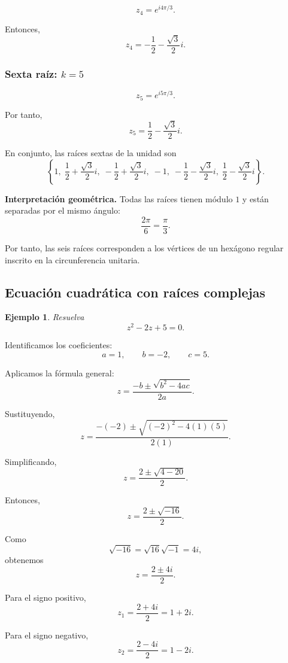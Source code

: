 \documentclass[12pt]{article}
\newtheorem{Ejem}{Ejemplo}
\begin{document}
\[
z_4=e^{i4\pi/3}.
\]

Entonces,
\[
\boxed{
z_4=
-\frac12-\frac{\sqrt3}{2}i
}.
\]

\subsubsection*{Sexta raíz: $k=5$}

\[
z_5=e^{i5\pi/3}.
\]

Por tanto,
\[
\boxed{
z_5=
\frac12-\frac{\sqrt3}{2}i
}.
\]

En conjunto, las raíces sextas de la unidad son
\[
\boxed{
\left\{
1,\;
\frac12+\frac{\sqrt3}{2}i,\;
-\frac12+\frac{\sqrt3}{2}i,\;
-1,\;
-\frac12-\frac{\sqrt3}{2}i,\;
\frac12-\frac{\sqrt3}{2}i
\right\}
}.
\]

\medskip

\noindent
\textbf{Interpretación geométrica.}
Todas las raíces tienen módulo $1$ y están separadas por el
mismo ángulo:
\[
\frac{2\pi}{6}
=
\frac{\pi}{3}.
\]

Por tanto, las seis raíces corresponden a los vértices de un
hexágono regular inscrito en la circunferencia unitaria.

\subsection{Ecuación cuadrática con raíces complejas}

\begin{Ejem}
Resuelva
\[
z^2-2z+5=0.
\]
\end{Ejem}

Identificamos los coeficientes:
\[
a=1,
\qquad
b=-2,
\qquad
c=5.
\]

Aplicamos la fórmula general:
\[
z=
\frac{-b\pm\sqrt{b^2-4ac}}{2a}.
\]

Sustituyendo,
\[
z
=
\frac{-(-2)\pm
\sqrt{(-2)^2-4(1)(5)}}{2(1)}.
\]

Simplificando,
\[
z
=
\frac{2\pm\sqrt{4-20}}{2}.
\]

Entonces,
\[
z
=
\frac{2\pm\sqrt{-16}}{2}.
\]

Como
\[
\sqrt{-16}
=
\sqrt{16}\sqrt{-1}
=
4i,
\]
obtenemos
\[
z
=
\frac{2\pm4i}{2}.
\]

Para el signo positivo,
\[
z_1
=
\frac{2+4i}{2}
=
1+2i.
\]

Para el signo negativo,
\[
z_2
=
\frac{2-4i}{2}
=
1-2i.
\]
\end{document}
